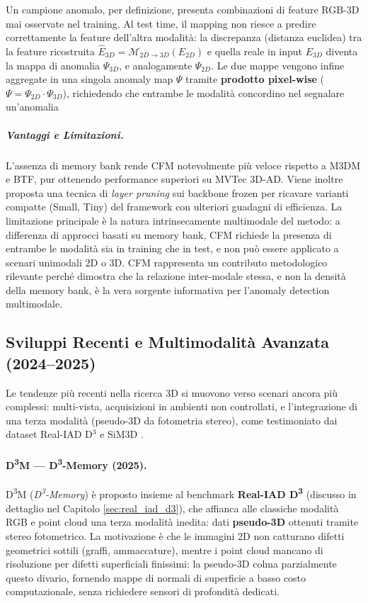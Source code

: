Un campione anomalo, per definizione, presenta combinazioni di feature RGB-3D mai osservate nel training. Al test time, il mapping non riesce a predire correttamente la feature dell'altra modalità: la discrepanza (distanza euclidea) tra la feature ricostruita $\hat{E}_{3D} = \mathcal{M}_{2D\to3D}(E_{2D})$ e quella reale in input $E_{3D}$ diventa la mappa di anomalia $\Psi_{3D}$, e analogamente $\Psi_{2D}$. Le due mappe vengono infine aggregate in una singola anomaly map $\Psi$ tramite \textbf{prodotto pixel-wise} ($\Psi = \Psi_{2D} \cdot \Psi_{3D}$), richiedendo che entrambe le modalità concordino nel segnalare un'anomalia

\subparagraph{Vantaggi e Limitazioni.}
L'assenza di memory bank rende CFM notevolmente più veloce rispetto a M3DM e BTF, pur ottenendo performance superiori su MVTec 3D-AD. Viene inoltre proposta una tecnica di \textit{layer pruning} sui backbone frozen per ricavare varianti compatte (Small, Tiny) del framework con ulteriori guadagni di efficienza. La limitazione principale è la natura intrinsecamente multimodale del metodo: a differenza di approcci basati su memory bank, CFM richiede la presenza di entrambe le modalità sia in training che in test, e non può essere applicato a scenari unimodali 2D o 3D. CFM rappresenta un contributo metodologico rilevante perché dimostra che la relazione inter-modale stessa, e non la densità della memory bank, è la vera sorgente informativa per l'anomaly detection multimodale.


\subsection{Sviluppi Recenti e Multimodalità Avanzata (2024--2025)}
\label{subsec:metodi-3d-recenti}

Le tendenze più recenti nella ricerca 3D si muovono verso scenari ancora più complessi: multi-vista, acquisizioni in ambienti non controllati, e l'integrazione di una terza modalità (pseudo-3D da fotometria stereo), come testimoniato dai dataset Real-IAD D$^3$ \cite{zhu2025realiadd3} e SiM3D \cite{sim3d2025}.


\paragraph{D\textsuperscript{3}M --- D\textsuperscript{3}-Memory (2025).}
D\textsuperscript{3}M (\textit{D\textsuperscript{3}-Memory}) \cite{zhu2025realiadd3} è proposto insieme al benchmark \textbf{Real-IAD D\textsuperscript{3}} (discusso in dettaglio nel Capitolo \ref{sec:real_iad_d3}), che affianca alle classiche modalità RGB e point cloud una terza modalità inedita: dati \textbf{pseudo-3D} ottenuti tramite stereo fotometrico. La motivazione è che le immagini 2D non catturano difetti geometrici sottili (graffi, ammaccature), mentre i point cloud mancano di risoluzione per difetti superficiali finissimi: la pseudo-3D colma parzialmente questo divario, fornendo mappe di normali di superficie a basso costo computazionale, senza richiedere sensori di profondità dedicati.


